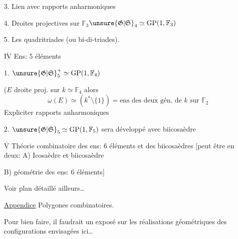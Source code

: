 3. Lien avec rapports anharmoniques

4. Droites projectives sur $\mathbb F_3$\quad $\unsure{\mathfrak G|\mathfrak S}_4\simeq\mathrm{GP}(1,\mathbb F_3)$

5. Les quadritriades (ou bi-di-triades).


$\overline{\underline{\mathrm{IV}}}$ Ens: 5 éléments


1. $\unsure{\mathfrak G|\mathfrak S}_5^+\simeq\mathrm{GP}(1,\mathbb F_4)$


 ($E$ droite proj. sur $k\simeq\mathbb F_4$ alors
\[
\omega(E)\simeq(k^*\setminus\{1\})=\text{ens des deux gén. de }k\text{ sur }\mathbb F_2
\]
Expliciter rapports anharmoniques

2. $\unsure{\mathfrak G|\mathfrak S}_5\simeq\mathrm{GP}(1,\mathbb F_5)$ sera développé avec  biicosaèdre


$\overline{\underline{\mathrm V}}$ Théorie combinatoire des ens: 6 éléments et des biicosaèdres [peut être  en deux: A) Icosaèdre et biicosaèdre

B) géométrie des ens: 6 éléments]

Voir plan détaillé ailleurs\ldots


\uline{Appendice} Polygones combinatoires.

Pour bien faire, il faudrait un exposé sur les réalisations géométriques des configurations envisagées ici\ldots

